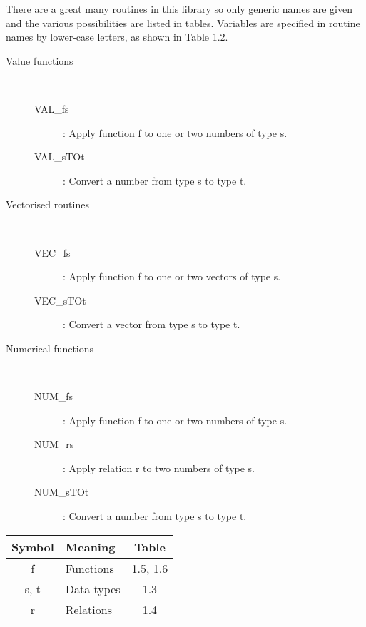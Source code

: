 There are a great many routines in this library so only generic names are given
and the various possibilities are listed in tables.
Variables are specified in routine names by lower-case letters, as shown in
Table 1.2.

\begin{description}

\item [Value functions] --- 

\begin{description}
\item [VAL\_fs] : Apply function f to one or two numbers of type s.
\item [VAL\_sTOt] : Convert a number from type s to type t.
\end{description}

\item [Vectorised routines] ---

\begin{description}
\item [VEC\_fs] : Apply function f to one or two vectors of type s.
\item [VEC\_sTOt] : Convert a vector from type s to type t.
\end{description}

\item [Numerical functions] ---

\begin{description}
\item [NUM\_fs] : Apply function f to one or two numbers of type s.
\item [NUM\_rs] : Apply relation r to two numbers of type s.
\item [NUM\_sTOt] : Convert a number from type s to type t.
\end{description}

\end{description}

\vspace*{5mm}

\begin{center}
\begin{tabular}{|c|l|c|}
\hline
{\bf Symbol } & {\bf Meaning } & { Table } \\
\hline
f    & Functions  & 1.5, 1.6 \\
s, t & Data types & 1.3      \\
r    & Relations  & 1.4      \\
\hline
\end{tabular}
\end{center}

